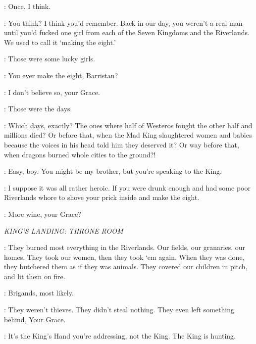 \RENLY: Once. I think. 

\ROBERT: You think? I think you'd remember. Back in our day, you weren't a real man until you'd fucked one girl from each of the Seven Kingdoms and the Riverlands. We used to call it `making the eight.'

\RENLY: Those were some lucky girls. 

\ROBERT: You ever make the eight, Barristan? 

\SELMY: I don't believe so, your Grace. 

\ROBERT: Those were the days. 

\RENLY: Which days, exactly? The ones where half of Westeros fought the other half and millions died? Or before that, when the Mad King slaughtered women and babies because the voices in his head told him they deserved it? Or way before that, when dragons burned whole cities to the ground?! 

\ROBERT: Easy, boy. You might be my brother, but you're speaking to the King. 

\RENLY: I suppose it was all rather heroic. If you were drunk enough and had some poor Riverlands whore to shove your prick inside and make the eight. 


\LANCEL: More wine, your Grace? 


\scene

\textit{KING'S LANDING: THRONE ROOM} 


\SOUTHERNFARMER: They burned most everything in the Riverlands. Our fields, our granaries, our homes. They took our women, then they took `em again. When they was done, they butchered them as if they was animals. They covered our children in pitch, and lit them on fire. 

\PYCELLE: Brigands, most likely. 

\SOUTHERNFARMER: They weren't thieves. They didn't steal nothing. They even left something behind, Your Grace. 

\PYCELLE: It's the King's Hand you're addressing, not the King. The King is hunting. 


